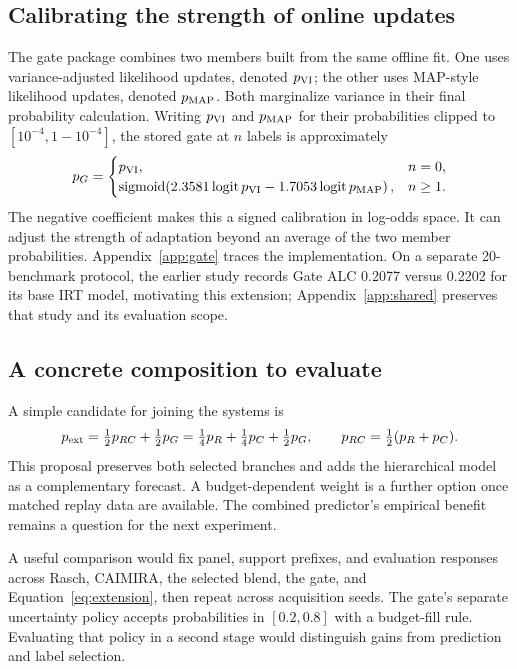 \subsection{Calibrating the strength of online updates}
The gate package combines two members built from the same offline fit. One uses variance-adjusted likelihood updates, denoted $p_{\rm VI}$; the other uses MAP-style likelihood updates, denoted $p_{\rm MAP}$. Both marginalize variance in their final probability calculation. Writing $p_{\rm VI}$ and $p_{\rm MAP}$ for their probabilities clipped to $[10^{-4},1-10^{-4}]$, the stored gate at $n$ labels is approximately
\begin{equation}
 p_G=
 \begin{cases}
 p_{\rm VI}, & n=0,\\
 \operatorname{sigmoid}\!\left(2.3581\operatorname{logit} p_{\rm VI}-1.7053\operatorname{logit} p_{\rm MAP}\right), & n\ge1.
 \end{cases}
 \label{eq:gate}
\end{equation}
The negative coefficient makes this a signed calibration in log-odds space. It can adjust the strength of adaptation beyond an average of the two member probabilities. Appendix~\ref{app:gate} traces the implementation. On a separate 20-benchmark protocol, the earlier study records Gate ALC 0.2077 versus 0.2202 for its base IRT model, motivating this extension; Appendix~\ref{app:shared} preserves that study and its evaluation scope.

\subsection{A concrete composition to evaluate}
A simple candidate for joining the systems is
\begin{equation}
 p_{\rm ext}=\tfrac12p_{RC}+\tfrac12p_G
            =\tfrac14p_R+\tfrac14p_C+\tfrac12p_G,
 \qquad p_{RC}=\tfrac12(p_R+p_C).
 \label{eq:extension}
\end{equation}
This proposal preserves both selected branches and adds the hierarchical model as a complementary forecast. A budget-dependent weight is a further option once matched replay data are available. The combined predictor's empirical benefit remains a question for the next experiment.

A useful comparison would fix panel, support prefixes, and evaluation responses across Rasch, CAIMIRA, the selected blend, the gate, and Equation~\ref{eq:extension}, then repeat across acquisition seeds. The gate's separate uncertainty policy accepts probabilities in $[0.2,0.8]$ with a budget-fill rule. Evaluating that policy in a second stage would distinguish gains from prediction and label selection.

